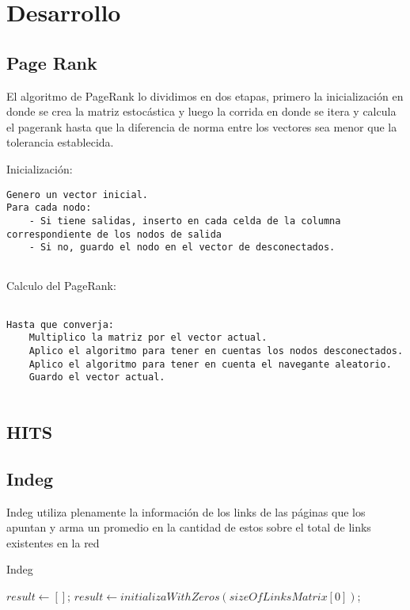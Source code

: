 \section{Desarrollo}

\subsection{Page Rank}
El algoritmo de PageRank lo dividimos en dos etapas, primero la inicializaci\'on en donde se crea la matriz estoc\'astica y luego la corrida en donde se itera y calcula el pagerank hasta que la diferencia de norma entre los vectores sea menor que la tolerancia establecida.

Inicializaci\'on:
\begin{lstlisting}[frame=single]  
Genero un vector inicial.
Para cada nodo:
	- Si tiene salidas, inserto en cada celda de la columna correspondiente de los nodos de salida
	- Si no, guardo el nodo en el vector de desconectados.
	
\end{lstlisting}

Calculo del PageRank:
\begin{lstlisting}[frame=single] 

Hasta que converja:
	Multiplico la matriz por el vector actual.
	Aplico el algoritmo para tener en cuentas los nodos desconectados.
	Aplico el algoritmo para tener en cuenta el navegante aleatorio.
	Guardo el vector actual.
	
\end{lstlisting}


\subsection{HITS}

\subsection{Indeg}

Indeg utiliza plenamente la información de los links de las páginas que los apuntan y arma un promedio en la cantidad de estos sobre el total de links existentes en la red

\begin{algorithm}
\caption{Indeg}\label{euclid}
\begin{algorithmic}[1]
\State $result \gets []$;
\State $result \gets initializaWithZeros(sizeOfLinksMatrix[0])$;
	\ENDFOR
\ENDFOR
\end{algorithmic}
\end{algorithm}
